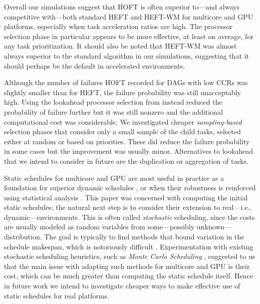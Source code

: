 \documentclass[runningheads]{llncs}
\begin{document}
Overall our simulations suggest that HOFT is often superior to---and always competitive with---both standard HEFT and HEFT-WM for multicore and GPU platforms, especially when task acceleration ratios are high. The processor selection phase in particular appears to be more effective, at least on average, for any task prioritization. It should also be noted that HEFT-WM was almost always superior to the standard algorithm in our simulations, suggesting that it should perhaps be the default in accelerated environments. 

Although the number of failures HOFT recorded for DAGs with low CCRs was slightly smaller than for HEFT, the failure probability was still unacceptably high. Using the lookahead processor selection from \cite{bittencourt10} instead reduced the probability of failure further but it was still nonzero and the additional computational cost was considerable. We investigated cheaper {\em sampling-based} selection phases that consider only a small sample of the child tasks, selected either at random or based on priorities. These did reduce the failure probability in some cases but the improvement was usually minor. Alternatives to lookahead that we intend to consider in future are the duplication \cite{duplication} or aggregation of tasks.

Static schedules for multicore and GPU are most useful in practice as a foundation for superior dynamic schedules \cite{agullo2016}, or when their robustness is reinforced using statistical analysis \cite{ZHENG20131673}. This paper was concerned with computing the initial static schedules; the natural next step is to consider their extension to real---i.e., dynamic---environments. This is often called {\em stochastic} scheduling, since the costs are usually modeled as random variables from some---possibly unknown---distribution. The goal is typically to find methods that bound variation in the schedule makespan, which is notoriously difficult \cite{hagstrom88}. Experimentation with existing stochastic scheduling heuristics, such as {\em Monte Carlo Scheduling} \cite{ZHENG20131673}, suggested to us that the main issue with adapting such methods for multicore and GPU is their cost, which can be much greater than computing the static schedule itself. Hence in future work we intend to investigate cheaper ways to make effective use of static schedules for real platforms.  

\end{document}

